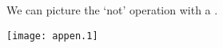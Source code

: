 We can picture the `not' operation with a 
.
\begin{center}
  \texttt{[image: appen.1]}
%
%
%
%
%
%

\end{center}
